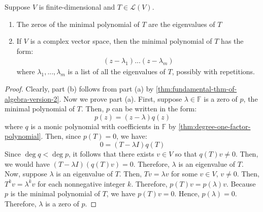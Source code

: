 \documentclass{article}
\begin{document}
\begin{theorem}
  \label{thm:eigenvalues-are-the-zeros-of-the-minimal-polynomial}
  Suppose $V$ is finite-dimensional and $T \in \mathcal{L}(V)$.
  \begin{enumerate}
    \item The zeros of the minimal polynomial of $T$ are the
      eigenvalues of $T$
    \item If $V$ is a complex vector space, then the minimal
      polynomial of $T$ has the form:
      \begin{align*}
        (z-\lambda_1)...(z-\lambda_m)
      \end{align*}
      where $\lambda_1,...,\lambda_m$ is a list of all the eigenvalues
      of $T$, possibly with repetitions.
  \end{enumerate}
\end{theorem}
\begin{proof}
  Clearly, part (b) follows from part (a) by
  \cref{thm:fundamental-thm-of-algebra-version-2}. Now we prove part
  (a). First, suppose $\lambda \in \mathbb{F}$ is a zero of $p$, the
  minimal polynomial of $T$. Then, $p$ can be written in the form:
  $$p(z) = (z - \lambda) q(z)$$
  where $q$ is a monic polynomial with coefficients in $\mathbb{F}$ by
  \cref{thm:degree-one-factor-polynomial}. Then, since $p(T) = 0$, we
  have:
  $$0 = (T - \lambda I) q(T)$$
  Since $\deg q < \deg p$, it follows that there exists $v \in V$ so
  that $q(T)v \ne 0$. Then, we would have $(T - \lambda I) (q(T) v) =
  0$. Therefore, $\lambda$ is an eigenvalue of $T$. Now, suppose
  $\lambda$ is an eigenvalue of $T$. Then, $Tv = \lambda v$ for some
  $v \in V$, $v \ne 0$. Then, $T^k v = \lambda^k v$ for each
  nonnegative integer $k$. Therefore, $p(T) v = p(\lambda) v$. Because
  $p$ is the minimal polynomial of $T$, we have $p(T)v = 0$. Hence,
  $p(\lambda) = 0$. Therefore, $\lambda$ is a zero of $p$. 
\end{proof}
\end{document}
